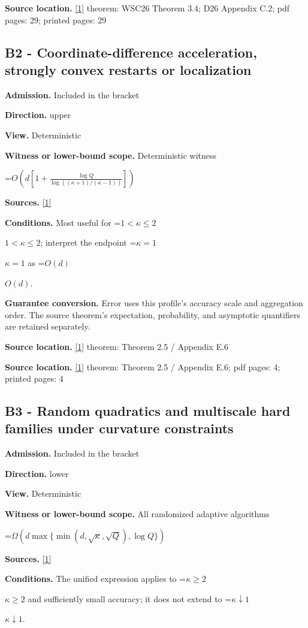 \documentclass[10pt,a4paper]{article}
\newcommand{\AtlasMath}[1]{\par\begingroup\centering\setbox0=\hbox{$\displaystyle #1$}\ifdim\wd0>1.4\linewidth\typeout{ATLAS WIDE FORMULA: \the\wd0}\fi\ifdim\wd0>\linewidth\resizebox{\linewidth}{!}{\box0}\else\box0\fi\par\endgroup}
\newcommand{\AtlasInlineMath}[1]{\begingroup\setbox0=\hbox{$#1$}\ifdim\wd0>.4\linewidth\endgroup\AtlasMath{#1}\else\endgroup$#1$\fi}
\begin{document}
\textbf{Source location.} \href{https://arxiv.org/html/2610.00345v1}{[1]} theorem: WSC26 Theorem 3.4; D26 Appendix C.2; pdf pages: 29; printed pages: 29

\subsection{B2 - Coordinate-difference acceleration, strongly convex restarts or localization}
\textbf{Admission.} Included in the bracket

\textbf{Direction.} upper

\textbf{View.} Deterministic

\textbf{Witness or lower-bound scope.} Deterministic witness

\AtlasMath{O\!\left(d\left[1+\frac{\log Q}{\log((\kappa+1)/(\kappa-1))}\right]\right)}
\textbf{Sources.} \href{https://arxiv.org/html/2610.00345v1}{[1]}

\textbf{Conditions.} Most useful for \AtlasInlineMath{1<\kappa\le2}; interpret the endpoint \AtlasInlineMath{\kappa=1} as \AtlasInlineMath{O(d)}.

\textbf{Guarantee conversion.} Error uses this profile's accuracy scale and aggregation order. The source theorem's expectation, probability, and asymptotic quantifiers are retained separately.

\textbf{Source location.} \href{https://arxiv.org/html/2610.00345v1}{[1]} theorem: Theorem 2.5 / Appendix E.6

\textbf{Source location.} \href{https://arxiv.org/html/2610.00345v1}{[1]} theorem: Theorem 2.5 / Appendix E.6; pdf pages: 4; printed pages: 4

\subsection{B3 - Random quadratics and multiscale hard families under curvature constraints}
\textbf{Admission.} Included in the bracket

\textbf{Direction.} lower

\textbf{View.} Deterministic

\textbf{Witness or lower-bound scope.} All randomized adaptive algorithms

\AtlasMath{\Omega\!\left(d\max\{\min(d,\sqrt\kappa,\sqrt Q),\log Q\}\right)}
\textbf{Sources.} \href{https://arxiv.org/html/2610.00345v1}{[1]}

\textbf{Conditions.} The unified expression applies to \AtlasInlineMath{\kappa\ge2} and sufficiently small accuracy; it does not extend to \AtlasInlineMath{\kappa\downarrow1}.
\end{document}
